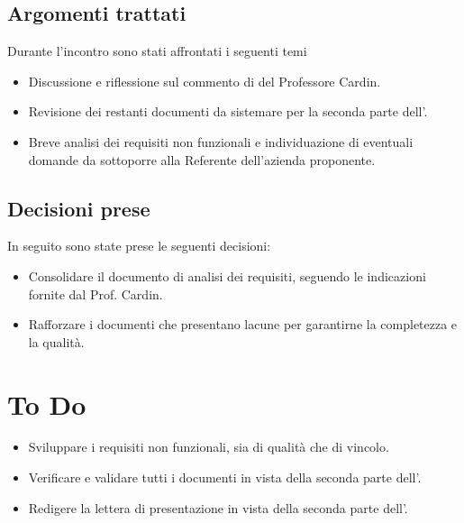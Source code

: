 \documentclass[a4paper, 12pt]{article}
\begin{document}
\subsection{Argomenti trattati}
Durante l’incontro sono stati affrontati i seguenti temi
\begin{itemize}
    \item Discussione e riflessione sul commento di  del Professore Cardin.
    \item Revisione dei restanti documenti da sistemare per la seconda parte dell'.
    \item Breve analisi dei requisiti non funzionali e individuazione di eventuali domande da sottoporre alla Referente dell’azienda proponente.
\end{itemize}

\subsection{Decisioni prese}
In seguito sono state prese le seguenti decisioni:
\begin{itemize}
    \item Consolidare il documento di analisi dei requisiti, seguendo le indicazioni fornite dal Prof. Cardin.
    \item Rafforzare i documenti che presentano lacune per garantirne la completezza e la qualità.
\end{itemize}

\section{To Do}
\begin{itemize}
    \item Sviluppare i requisiti non funzionali, sia di qualità che di vincolo.
    \item Verificare e validare tutti i documenti in vista della seconda parte dell'.
    \item Redigere la lettera di presentazione in vista della seconda parte dell'.
\end{itemize}
\end{document}
